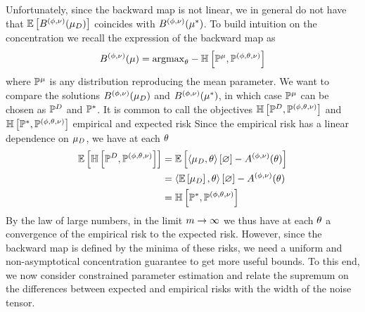 Unfortunately, since the backward map is not linear, we in general do not have that $\mathbb{E}\left[B^{(\phi,\nu)}(\mu_{D})\right]$ coincides with $B^{(\phi,\nu)}(\mu^*)$.
To build intuition on the concentration we recall the expression of the backward map as
\begin{align*}
    B^{(\phi,\nu)}(\mu)
    = \mathrm{argmax}_{\theta} -\mathbb{H}\left[\mathbb{P}^{\mu},\mathbb{P}^{(\phi,\theta,\nu)}\right]
\end{align*}
where $\mathbb{P}^{\mu}$ is any distribution reproducing the mean parameter.
We want to compare the solutions $B^{(\phi,\nu)}(\mu_{D})$ and $B^{(\phi,\nu)}(\mu^*)$, in which case $\mathbb{P}^{\mu}$ can be chosen as $\mathbb{P}^{D}$ and $\mathbb{P}^*$.
It is common to call the objectives $\mathbb{H}\left[\mathbb{P}^{D},\mathbb{P}^{(\phi,\theta,\nu)}\right]$ and $\mathbb{H}\left[\mathbb{P}^*,\mathbb{P}^{(\phi,\theta,\nu)}\right]$ empirical and expected risk \cite{shalev-schwartz_shai_understanding_2014}
Since the empirical risk has a linear dependence on $\mu_{D}$, we have at each $\theta$
\begin{align*}
    \mathbb{E}\left[\mathbb{H}\left[\mathbb{P}^{D},\mathbb{P}^{(\phi,\theta,\nu)}\right]\right]
    &= \mathbb{E}\left[\left\langle \mu_{D},\theta\right\rangle \left[ \varnothing \right] - A^{(\phi,\nu)}(\theta)\right] \\
    &= \left\langle \mathbb{E}\left[\mu_{D}\right],\theta\right\rangle \left[ \varnothing \right] - A^{(\phi,\nu)}(\theta) \\
    &= \mathbb{H}\left[\mathbb{P}^*,\mathbb{P}^{(\phi,\theta,\nu)}\right]
\end{align*}
By the law of large numbers, in the limit $m\rightarrow\infty$ we thus have at each $\theta$ a convergence of the empirical risk to the expected risk.
However, since the backward map is defined by the minima of these risks, we need a uniform and non-asymptotical concentration guarantee to get more useful bounds.
To this end, we now consider constrained parameter estimation and relate the supremum on the differences between expected and empirical risks with the width of the noise tensor.

